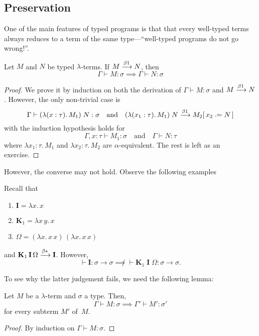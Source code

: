 \subsection{Preservation}
One of the main features of typed programs is that that every well-typed terms
always reduces to a term of the same type---``well-typed programs do not go
wrong!''.
\begin{theorem}
  \label{thm:preservation}
  Let $M$ and $N$ be typed $\lambda$-terms. 
  If $M \xrightarrow{\beta1} N$, then
  \[
    \Gamma \vdash M : \sigma \implies \Gamma \vdash N : \sigma
  \]
\end{theorem}
\begin{proof}
  We prove it by induction on both the derivation of $\Gamma \vdash M :
  \sigma$ and $M \xrightarrow{\beta1} N$. However, the only non-trivial case is
  \[
    \Gamma \vdash (\lambda (x : \tau).\, M_1)\; N : \sigma
    \quad\text{and}\quad
    (\lambda (x_1 : \tau).\, M_1)\;N \onereduce M_2\subst{x_2}{N}
  \]
  with the induction hypothesis holds for
  \[
    \Gamma, x : \tau \vdash M_1 : \sigma
    \quad\text{and}\quad
    \Gamma \vdash N : \tau
  \]
  where $\lambda x_1:\tau.\,M_1$ and $\lambda x_2:\tau.\,M_2$ are
  $\alpha$-equivalent. The rest is left as an exercise.
\end{proof}
However, the converse may not hold. Observe the following examples
\begin{example}
  Recall that 
  \begin{enumerate}
    \item $\mathbf{I} = \lambda x.\, x$
    \item $\mathbf{K}_1 = \lambda x\,y.\, x$
    \item $\Omega = (\lambda x.\, x\,x)\,(\lambda x.\, x\,x)$
  \end{enumerate}
  and $\mathbf{K}_1\,\mathbf{I}\,\Omega \xrightarrow{\beta*} \mathbf{I}$. However, 
  \[
    \vdash \mathbf{I} : \sigma \to \sigma
    \not\implies
    \vdash \mathbf{K}_1\;\mathbf{I}\;\Omega : \sigma \to \sigma.
  \]
\end{example}
To see why the latter judgement fails, we need the following lemma:
\begin{lemma}
  Let $M$ be a  $\lambda$-term and $\sigma$ a type. Then,  
  \[
    \Gamma \vdash M : \sigma 
    \implies \Gamma' \vdash M' : \sigma'
  \]
  for every subterm $M'$ of~$M$.
\end{lemma}
\begin{proof}
  By induction on $\Gamma \vdash M : \sigma$.
\end{proof}
%
%
